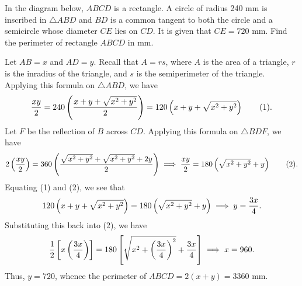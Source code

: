 \clearpage
\begin{question}[3360]\label{Q::2024-J-1-25}
    In the diagram below, $ABCD$ is a rectangle. A circle of radius 240 mm is inscribed in $\triangle ABD$ and $BD$ is a common tangent to both the circle and a semicircle whose diameter $CE$ lies on $CD$. It is given that $CE = 720$ mm. Find the perimeter of rectangle $ABCD$ in mm.

    \begin{center}
    \end{center}
\end{question}
\begin{solution*}
    Let $AB = x$ and $AD = y$. Recall that $A = rs$, where $A$ is the area of a triangle, $r$ is the inradius of the triangle, and $s$ is the semiperimeter of the triangle. Applying this formula on $\triangle ABD$, we have \[\frac{xy}{2} = 240\left( \frac{x + y + \sqrt{x^2 + y^2}}{2} \right) = 120\left( x + y + \sqrt{x^2 + y^2} \right) \tag{1}.\] Let $F$ be the reflection of $B$ across $CD$. Applying this formula on $\triangle BDF$, we have \[2\left( \frac{xy}{2} \right) = 360\left( \frac{\sqrt{x^2 + y^2} + \sqrt{x^2 + y^2} + 2y}{2} \right) \implies \frac{xy}{2} = 180\left( \sqrt{x^2 + y^2} + y \right) \tag{2}.\] Equating (1) and (2), we see that \[120\left( x + y + \sqrt{x^2 + y^2} \right) = 180\left( \sqrt{x^2 + y^2} + y \right) \implies y = \frac{3x}{4}.\] Substituting this back into (2), we have \[\frac12 \left[ x\left( \frac{3x}{4} \right) \right] = 180\left[ \sqrt{x^2 + \left( \frac{3x}{4} \right)^2} + \frac{3x}{4} \right] \implies x = 960.\] Thus, $y = 720$, whence the perimeter of $ABCD = 2(x + y) = 3360$ mm.
\end{solution*}